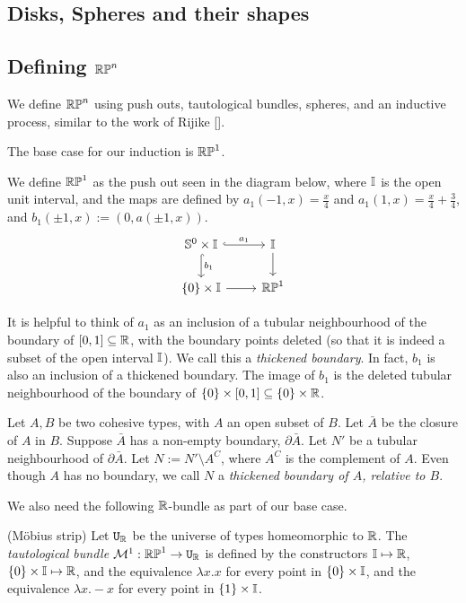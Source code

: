 \documentclass{amsart}
\begin{document}
\subsection{Disks, Spheres and their shapes}
\subsection{Defining $\mathbb{RP}^n$}
We define $\mathbb{RP}^n$ using push outs, tautological bundles, spheres, and an inductive process, similar to the work of Rijike [].

The base case for our induction is $\mathbb{RP}^1$.

\begin{definition}
We define $\mathbb{RP}^1$ as the push out seen in the diagram below, where $\mathbb{I}$ is the open unit interval, and the maps are defined by $a_1(-1,x) = \frac{x}{4}$ and $a_1(1,x)= \frac{x}{4} + \frac{3}{4}$, and $b_1 (\pm 1, x) := (0, a(\pm1, x))$.\\
\[\begin{tikzcd}
\set{S}^0 \times \set{I} \arrow[r, hook, "a_1"] \arrow[d, hook, "b_1" ] & \set{I} \arrow[d]\\
\{0 \} \times \set{I} \arrow[r] & \set{RP}^1
\end{tikzcd}
\]
\end{definition}

It is helpful to think of $a_1$ as an inclusion of a tubular neighbourhood of the boundary of $[0,1] \subseteq \mathbb{R}$, with the boundary points deleted (so that it is indeed a subset of the open interval $\mathbb{I}$). We call this a \emph{thickened boundary}. In fact, $b_1$ is also an inclusion of a thickened boundary. The image of $b_1$ is the deleted tubular neighbourhood of the boundary of $\{0\} \times [0,1] \subseteq \{0\} \times \mathbb{R}$.

\begin{definition}
Let $A, B$ be two cohesive types, with $A$ an open subset of $B$. Let $\bar{A}$ be the closure of $A$ in $B$. Suppose $\bar{A}$ has a non-empty boundary, $\partial \bar{A}$. Let $N'$ be a tubular neighbourhood of $\partial\bar{A}$. Let $N := N' \setminus A^C$, where $A^C$ is the complement of $A$. Even though $A$ has no boundary, we call $N$ a \emph{thickened boundary of $A$, relative to $B$}.
\end{definition}

We also need the following $\mathbb{R}$-bundle as part of our base case. 
\begin{definition}(M\"{o}bius strip)
Let $\mathtt{U}_{\mathbb{R}}$ be the universe of types homeomorphic to $\mathbb{R}$. The \emph{tautological bundle} $\mathcal{M}^1: \mathbb{RP}^1 \rightarrow \mathtt{U}_{\mathbb{R}}$ is defined by the constructors $\mathbb{I} \mapsto \mathbb{R}$, $\{0 \} \times \mathbb{I} \mapsto \mathbb{R}$, and the equivalence $\lambda x. x$ for every point in $\{0\} \times \mathbb{I}$, and the equivalence $\lambda x. -x$ for every point in $\{1\} \times \mathbb{I}$.
\end{definition}
\end{document}
